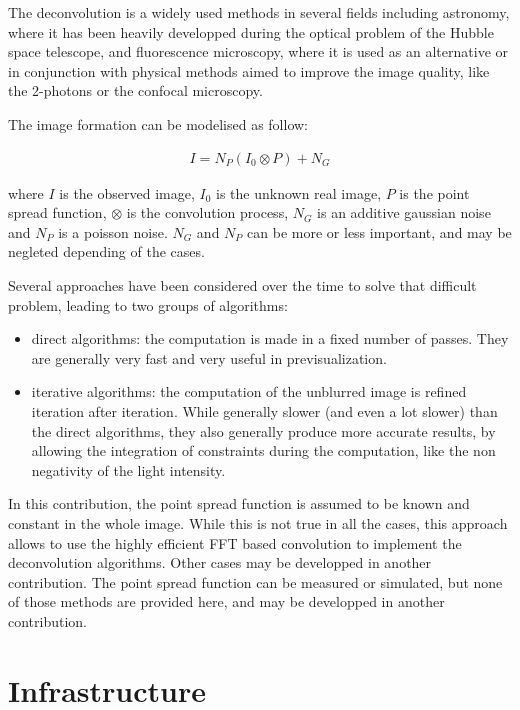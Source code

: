 \documentclass{InsightArticle}
\begin{document}
The deconvolution is a widely used methods in several fields including astronomy, where it has been heavily developped
during the optical problem of the Hubble space telescope, and fluorescence microscopy, where it is used as an alternative
or in conjunction with physical methods aimed to improve the image quality, like the 2-photons or the confocal microscopy.

The image formation can be modelised as follow:


\begin{eqnarray}
\label{eq:imageFormation}
I = N_P( I_0 \otimes P ) + N_G
\end{eqnarray}

where $I$ is the observed image, $I_0$ is the unknown real image, $P$ is the point spread function, $\otimes$ is the convolution process,
$N_G$ is an additive gaussian noise and $N_P$ is a poisson noise. $N_G$ and $N_P$ can be more or less important, and may be negleted
depending of the cases.

Several approaches have been considered over the time to solve that difficult problem, leading to two groups of algorithms:

\begin{itemize}
 \item direct algorithms: the computation is made in a fixed number of passes. They are generally very fast and very useful in previsualization.
 \item iterative algorithms: the computation of the unblurred image is refined iteration after iteration. While generally slower
(and even a lot slower) than the direct algorithms, they also generally produce more accurate results, by allowing the integration
of constraints during the computation, like the non negativity of the light intensity.
\end{itemize}

In this contribution, the point spread function is assumed to be known and constant in the whole image. While this is not
true in all the cases, this approach allows to use the highly efficient FFT based convolution to implement the deconvolution
algorithms. Other cases may be developped in another contribution. The point spread function can be measured or simulated, but
none of those methods are provided here, and may be developped in another contribution.

\section{Infrastructure}
\end{document}
